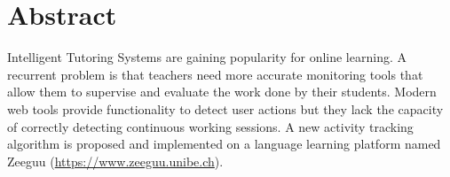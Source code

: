 \begingroup
\let\clearpage\relax
\let\cleardoublepage\relax
\let\cleardoublepage\relax

\chapter*{Abstract}
Intelligent Tutoring Systems are gaining popularity for online learning. A recurrent problem is that teachers need more accurate monitoring tools that allow them to supervise and evaluate the work done by their students. 
Modern web tools provide functionality to detect user actions but they lack the capacity of correctly detecting continuous working sessions. A new activity tracking algorithm is proposed and implemented on a language learning platform named Zeeguu (\url{https://www.zeeguu.unibe.ch}).



\vfill
%

\endgroup

\vfill
